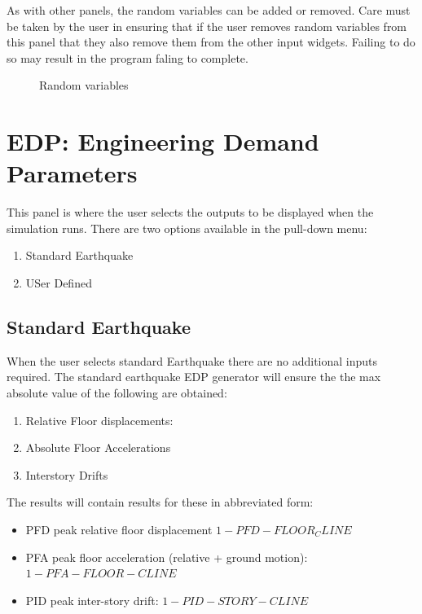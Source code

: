 As with other panels, the random variables can be added or removed. Care must be taken by the user in ensuring that if the user removes random variables from this panel that they also remove them from the other input widgets. Failing to do so may result in the program faling to complete.


\begin{figure}[!htbp]
  \caption{Random variables}
  \label{fig:figure11}
\end{figure}

\section{EDP: Engineering Demand Parameters}
This panel is where the user selects the outputs to be displayed when the simulation runs. There are two options available in the pull-down menu:
\begin{enumerate}
\item Standard Earthquake
\item USer Defined
\end{enumerate}

\subsection{Standard Earthquake}
When the user selects standard Earthquake there are no additional inputs required. The standard earthquake EDP generator will ensure the the max absolute value of the following are obtained: \begin{enumerate}
\item Relative Floor displacements:
\item Absolute Floor Accelerations
\item Interstory Drifts
\end{enumerate}

The  results will contain results for these in abbreviated form:
\begin{itemize}
\item PFD peak relative floor displacement $1-PFD-FLOOR_CLINE$
\item PFA peak floor acceleration (relative + ground motion): $1-PFA-FLOOR-CLINE$
\item PID peak inter-story drift: $1-PID-STORY-CLINE$
\end{itemize}

